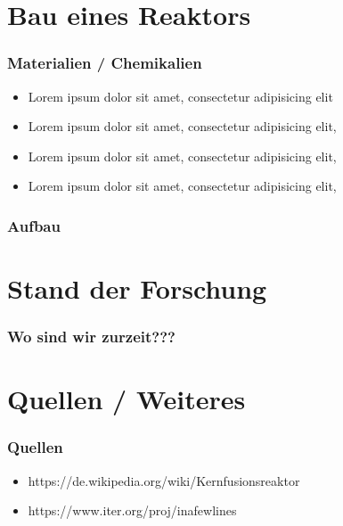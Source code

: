 \documentclass[aspectratio=169]{beamer}
\begin{document}
  \section{Bau eines Reaktors}

    \begin{frame}
      \frametitle{Materialien / Chemikalien}
      \begin{itemize}
        \item Lorem ipsum dolor sit amet, consectetur adipisicing elit
        \item Lorem ipsum dolor sit amet, consectetur adipisicing elit,
        \item Lorem ipsum dolor sit amet, consectetur adipisicing elit,
        \item Lorem ipsum dolor sit amet, consectetur adipisicing elit,
      \end{itemize}
    \end{frame}

    \begin{frame}
      \frametitle{Aufbau}
    \end{frame}

  \section{Stand der Forschung}

  \begin{frame}
    \frametitle{Wo sind wir zurzeit???}
  \end{frame}

  \section{Quellen / Weiteres}

    \begin{frame}
      \frametitle{Quellen}
      \begin{itemize}
        \item https://de.wikipedia.org/wiki/Kernfusionsreaktor
        \item https://www.iter.org/proj/inafewlines
      \end{itemize}
    \end{frame}
\end{document}
